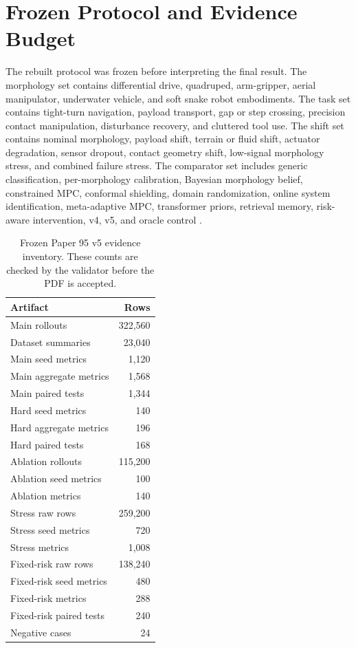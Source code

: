 \documentclass{article}
\begin{document}
\section{Frozen Protocol and Evidence Budget}
The rebuilt protocol was frozen before interpreting the final result. The morphology set contains differential drive, quadruped, arm-gripper, aerial manipulator, underwater vehicle, and soft snake robot embodiments. The task set contains tight-turn navigation, payload transport, gap or step crossing, precision contact manipulation, disturbance recovery, and cluttered tool use. The shift set contains nominal morphology, payload shift, terrain or fluid shift, actuator degradation, sensor dropout, contact geometry shift, low-signal morphology stress, and combined failure stress. The comparator set includes generic classification, per-morphology calibration, Bayesian morphology belief, constrained MPC, conformal shielding, domain randomization, online system identification, meta-adaptive MPC, transformer priors, retrieval memory, risk-aware intervention, v4, v5, and oracle control \citep{r103390app10228106,r107717peerjcs2016,r10114534458143446746,r101109lra20213067847,r101109tii20182874182,r101109tie20203026289,r103390en15145131,r1020517ir202419,r101049ietcta20170265,r101109tcst20192939248}.


\begin{table}[t]
\centering
\scriptsize
\begin{tabular}{lr}
\toprule
Artifact & Rows \\
\midrule
Main rollouts & 322,560 \\
Dataset summaries & 23,040 \\
Main seed metrics & 1,120 \\
Main aggregate metrics & 1,568 \\
Main paired tests & 1,344 \\
Hard seed metrics & 140 \\
Hard aggregate metrics & 196 \\
Hard paired tests & 168 \\
Ablation rollouts & 115,200 \\
Ablation seed metrics & 100 \\
Ablation metrics & 140 \\
Stress raw rows & 259,200 \\
Stress seed metrics & 720 \\
Stress metrics & 1,008 \\
Fixed-risk raw rows & 138,240 \\
Fixed-risk seed metrics & 480 \\
Fixed-risk metrics & 288 \\
Fixed-risk paired tests & 240 \\
Negative cases & 24 \\
\bottomrule
\end{tabular}
\caption{Frozen Paper 95 v5 evidence inventory. These counts are checked by the validator before the PDF is accepted.}
\label{tab:inventory}
\end{table}
\end{document}
